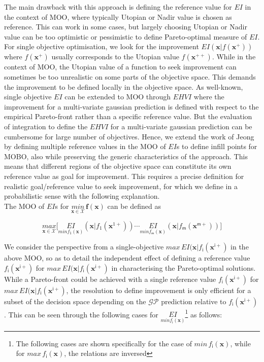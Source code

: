 The main drawback with this approach is defining the reference value for $EI$ in the context of MOO, where typically Utopian or Nadir value is chosen as reference. This can work in some cases, but largely choosing Utopian or Nadir value can be too optimistic or pessimistic to define Pareto-optimal measure of $EI$.
For single objective optimisation, we look for the improvement $EI(\bm{x}|f(\bm{x}^+))$ where $f(\bm{x}^+)$ usually corresponds to the Utopian value $f(\bm{x}^{++})$. 
While in the context of MOO, the Utopian value of a function to seek improvement can sometimes be too unrealistic on some parts of the objective space. 
This demands the improvement to be defined locally in the objective space. 
As well-known, single objective $EI$ can be extended to MOO through $EHVI$ where the improvement for a multi-variate gaussian prediction is defined with respect to the empirical Pareto-front rather than a specific reference value. 
 But the evaluation of integration to define the $EHVI$ for a multi-variate gaussian prediction can be cumbersome for large number of objectives. 
 Hence, we extend the work of Jeong by defining multiple reference values in the MOO of $EI$s to define infill points for MOBO, also while preserving the generic characteristics of the approach. 
 This means that different regions of the objective space can constitute its own reference value as goal for improvement. This requires a precise definition for realistic goal/reference value to seek improvement, for which we define in a probabilistic sense with the following explanation.\\
 
 
 The MOO of $EI$s for $\underset{\bm x \in \mathcal{X}}{min} \, \bm f(\bm x)$ can be defined as 
 
 \begin{equation}\label{Optim_EIs}
 \underset{\bm x \in \mathcal{X}}{max}\Big[ \underset{min f_{\mathsf{1}}(\bm{x})}{EI}(\bm{x}|f_{{1}}(\bm x^{1+})) \cdots \underset{min f_{\mathsf{m}}(\bm{x})}{EI}(\bm{x}|f_{\mathsf{m}}(\bm x^{\mathsf{m}+}))  \Big]
 \end{equation}
 
We consider the perspective from a single-objective $max \, EI(\bm{x}|f_{\mathsf{i}}(\bm x^{\mathsf{i}+})$ in the above MOO, so as to detail the independent effect of defining a reference value $f_{\mathsf{i}}(\bm x^{\mathsf{i}+})$ for $max \, EI(\bm{x}|f_{\mathsf{i}}(\bm x^{\mathsf{i}+})$ in characterising the Pareto-optimal solutions.
 While a Pareto-front could be achieved with a single reference value $f_{\mathsf{i}}(\bm x^{\mathsf{i}+})$ for $max \, EI(\bm{x}|f_{\mathsf{i}}(\bm x^{\mathsf{i}+})$, the resolution to define improvement is only efficient for a subset of the decision space depending on the $\mathcal{GP}$ prediction relative to $f_{\mathsf{i}}(\bm x^{\mathsf{i}+})$. This can be seen through the following cases for $\underset{min f_{\mathsf{i}}(\bm{x})}{EI}$\footnote{The following cases are shown specifically for the case of  $min \, f_{\mathsf{i}}(\bm{x})$, while for $max \, f_{\mathsf{i}}(\bm{x})$, the relations are inversed} as follows:
 
